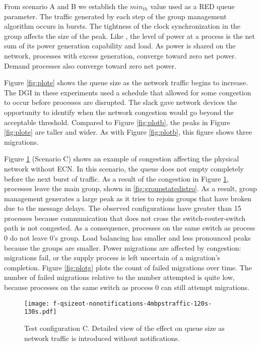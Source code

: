 From scenario A and B we establish the $min_{th}$ value used as a \ac{RED} queue parameter.
The traffic generated by each step of the group management algorithm occurs in bursts.
The tightness of the clock synchronization in the group affects the size of the peak.
Like \cite{HILTESTBED}, the level of power at a process is the net sum of its power generation capability and load.
As power is shared on the network, processes with excess generation, converge toward zero net power.
Demand processes also converge toward zero net power.


Figure \ref{fig:plote} shows the queue size as the network traffic begins to increase.
The \ac{DGI} in these experiments used a schedule that allowed for some congestion to occur before processes are disrupted.
The slack gave network devices the opportunity to identify when the network congestion would go beyond the acceptable threshold.
Compared to Figure \ref{fig:plotb}, the peaks in Figure \ref{fig:plote} are taller and wider.
As with Figure \ref{fig:plotb}, this figure shows three migrations.


Figure \ref{fig:plotf} (Scenario C) shows an example of congestion affecting the physical network without \ac{ECN}.
In this scenario, the queue does not empty completely before the next burst of traffic.
As a result of the congestion in Figure \ref{fig:plotf}, processes leave the main group, shown in \ref{fig:groupstatedistro}.
As a result, group management generates a large peak as it tries to rejoin groups that have broken due to the message delays.
The observed configurations have greater than 15 processes because communication that does not cross the switch-router-switch path is not congested.
As a consequence, processes on the same switch as process 0 do not leave 0's group.
Load balancing has smaller and less pronounced peaks because the groups are smaller.
Power migrations are affected by congestion: migrations fail, or the supply process is left uncertain of a migration's completion.
Figure \ref{fig:plotg} plots the count of failed migrations over time.
The number of failed migrations relative to the number attempted is quite low, because processes on the same switch as process 0 can still attempt migrations.

\begin{figure}
\centering
\texttt{[image: f-qsizeot-nonotifications-4mbpstraffic-120s-130s.pdf]}
\caption{Test configuration C.
Detailed view of the effect on queue size as network traffic is introduced without notifications.}
\label{fig:plotf}
\end{figure}

